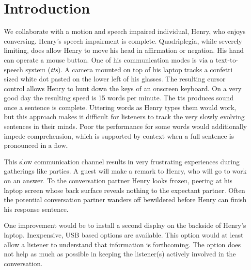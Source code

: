 \documentclass{sigchi}
\begin{document}






\section{Introduction}
We collaborate with a motion and speech impaired individual, Henry,
who enjoys conversing. Henry's speech impairment is
complete. Quadriplegia, while severely limiting, does allow Henry to
move his head in affirmation or negation. His hand can operate a mouse
button. One of his communication modes is via a text-to-speech system
({\em tts}). A camera mounted on top of his laptop tracks a confetti
sized white dot pasted on the lower left of his glasses. The resulting
cursor control allows Henry to hunt down the keys of an onscreen
keyboard. On a very good day the resulting speed is 15 words per
minute. The tts produces sound once a sentence is complete. Uttering
words as Henry types them would work, but this approach makes it
difficult for listeners to track the very slowly evolving sentences in
their minds. Poor tts performance for some words would additionally
impede comprehension, which is supported by context when a full
sentence is pronounced in a flow.

This slow communication channel results in very frustrating
experiences during gatherings like parties. A guest will make a remark
to Henry, who will go to work on an answer. To the conversation
partner Henry looks frozen, peering at his laptop screen whose back
surface reveals nothing to the expectant partner. Often the potential
conversation partner wanders off bewildered before Henry can finish
his response sentence.

One improvement would be to install a second display on the backside
of Henry's laptop. Inexpensive, USB based options are available. This
option would at least allow a listener to understand that information
is forthcoming. The option does not help as much as possible in
keeping the listener(s) actively involved in the conversation. 
\end{document}
